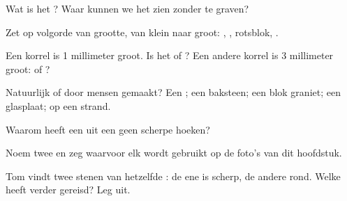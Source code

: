\begin{exercise}[$\star$]\label{exo:g3:stones-pebbles-sand:1}
Wat is het ? Waar kunnen we het zien zonder te graven?
\end{exercise}

\begin{exercise}[$\star$]\label{exo:g3:stones-pebbles-sand:2}
Zet op volgorde van grootte, van klein naar groot: , ,
rotsblok, .
\end{exercise}

\begin{exercise}[$\star$]\label{exo:g3:stones-pebbles-sand:3}
Een korrel is 1 millimeter groot. Is het  of ? Een andere korrel
is 3 millimeter groot:  of ?
\end{exercise}

\begin{exercise}[$\star$]\label{exo:g3:stones-pebbles-sand:4}
Natuurlijk of door mensen gemaakt? Een ; een baksteen; een blok
graniet; een glasplaat;  op een strand.
\end{exercise}

\begin{exercise}[$\star$]\label{exo:g3:stones-pebbles-sand:5}
Waarom heeft een  uit een  geen scherpe hoeken?
\end{exercise}

\begin{exercise}[$\star$]\label{exo:g3:stones-pebbles-sand:6}
Noem twee  en zeg waarvoor elk wordt gebruikt op de foto's van
dit hoofdstuk.
\end{exercise}

\begin{exercise}[$\star\star$]\label{exo:g3:stones-pebbles-sand:7}
Tom vindt twee stenen van hetzelfde : de ene is scherp, de andere
rond. Welke heeft verder gereisd? Leg uit.
\end{exercise}

